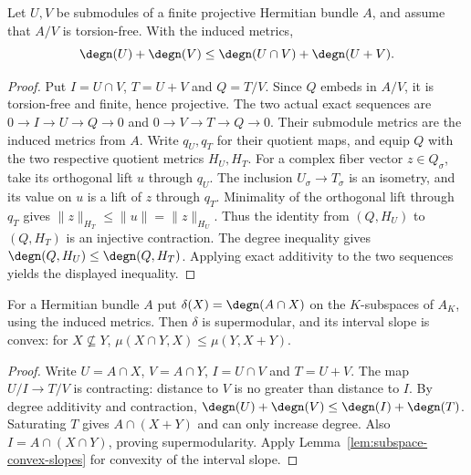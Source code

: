 \begin{lemma}
\label{lem:submodule-degree-supermodular}
\leanok
Let $U,V$ be submodules of a finite projective Hermitian bundle $A$,
and assume that $A/V$ is torsion-free. With the induced metrics,
\[
 \degn(U)+\degn(V)\leq\degn(U\cap V)+\degn(U+V).
\]
\end{lemma}
\begin{proof}
Put $I=U\cap V$, $T=U+V$ and $Q=T/V$. Since $Q$ embeds in $A/V$,
it is torsion-free and finite, hence projective. The two actual exact
sequences are $0\to I\to U\to Q\to0$ and
$0\to V\to T\to Q\to0$. Their submodule metrics are the induced
metrics from $A$. Write $q_U,q_T$ for their quotient maps, and equip $Q$
with the two respective quotient metrics $H_U,H_T$.
For a complex fiber vector $z\in Q_\sigma$, take its orthogonal lift
$u$ through $q_U$. The inclusion $U_\sigma\to T_\sigma$ is an isometry,
and its value on $u$ is a lift of $z$ through $q_T$. Minimality of the
orthogonal lift through $q_T$ gives
$\|z\|_{H_T}\leq\|u\|=\|z\|_{H_U}$. Thus the identity from
$(Q,H_U)$ to $(Q,H_T)$ is an injective contraction. The degree inequality
gives $\degn(Q,H_U)\leq\degn(Q,H_T)$. Applying exact additivity to
the two sequences yields the displayed inequality.
\end{proof}

\begin{lemma}
\label{lem:hermitian-subspace-supermodular}
\leanok
For a Hermitian bundle $A$ put $\delta(X)=\degn(A\cap X)$ on the
$K$-subspaces of $A_K$, using the induced metrics. Then $\delta$ is
supermodular, and its interval slope is convex:
for $X\not\subseteq Y$,
$\mu(X\cap Y,X)\leq\mu(Y,X+Y)$.
\end{lemma}
\begin{proof}
Write $U=A\cap X$, $V=A\cap Y$, $I=U\cap V$ and $T=U+V$.
The map $U/I\to T/V$ is contracting: distance to $V$ is no greater
than distance to $I$. By degree additivity and contraction,
$\degn(U)+\degn(V)\leq\degn(I)+\degn(T)$. Saturating $T$ gives
$A\cap(X+Y)$ and can only increase degree. Also
$I=A\cap(X\cap Y)$, proving supermodularity. Apply
Lemma~\ref{lem:subspace-convex-slopes} for convexity of the interval slope.
\end{proof}

